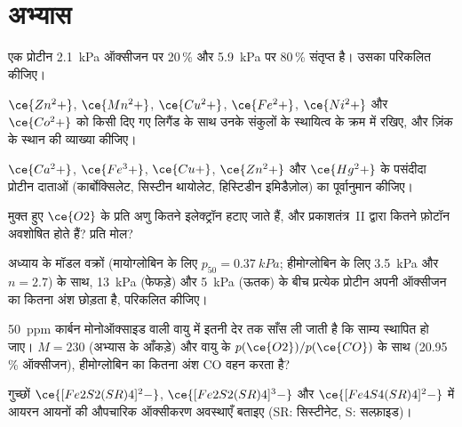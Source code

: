 \section{अभ्यास}

\begin{exercise}[$\star$]\label{exo:b3:bioinorganic:1}
एक प्रोटीन \qty{2.1}{kPa} ऑक्सीजन पर 20\,\% और \qty{5.9}{kPa} पर 80\,\% संतृप्त है। उसका
 परिकलित कीजिए।
\end{exercise}

\begin{exercise}[$\star$]\label{exo:b3:bioinorganic:2}
$\ce{Zn^2+}$, $\ce{Mn^2+}$, $\ce{Cu^2+}$, $\ce{Fe^2+}$, $\ce{Ni^2+}$ और $\ce{Co^2+}$ को किसी दिए गए लिगैंड के साथ उनके संकुलों के स्थायित्व के क्रम में
रखिए, और ज़िंक के स्थान की व्याख्या कीजिए।
\end{exercise}

\begin{exercise}[$\star$]\label{exo:b3:bioinorganic:3}
$\ce{Ca^2+}$, $\ce{Fe^3+}$, $\ce{Cu+}$, $\ce{Zn^2+}$ और $\ce{Hg^2+}$ के पसंदीदा प्रोटीन दाताओं (कार्बोक्सिलेट, सिस्टीन थायोलेट,
हिस्टिडीन इमिडैज़ोल) का पूर्वानुमान कीजिए।
\end{exercise}

\begin{exercise}[$\star$]\label{exo:b3:bioinorganic:4}
मुक्त हुए $\ce{O2}$ के प्रति अणु कितने इलेक्ट्रॉन हटाए जाते हैं, और प्रकाशतंत्र~II द्वारा कितने फ़ोटॉन
अवशोषित होते हैं? प्रति मोल?
\end{exercise}

\begin{exercise}[$\star\star$]\label{exo:b3:bioinorganic:5}
अध्याय के मॉडल वक्रों (मायोग्लोबिन के लिए $p_{50} = \qty{0.37}{kPa}$; हीमोग्लोबिन के लिए \qty{3.5}{kPa} और $n = 2.7$) के साथ,
\qty{13}{kPa} (फेफड़े) और \qty{5}{kPa} (ऊतक) के बीच प्रत्येक प्रोटीन अपनी ऑक्सीजन का कितना अंश छोड़ता है,
परिकलित कीजिए।
\end{exercise}

\begin{exercise}[$\star\star$]\label{exo:b3:bioinorganic:6}
\qty{50}{ppm} कार्बन मोनोऑक्साइड वाली वायु में इतनी देर तक साँस ली जाती है कि
साम्य स्थापित हो जाए। $M = 230$ (अभ्यास के आँकड़े) और वायु के $p(\ce{O2})/p(\ce{CO})$ के साथ
(20.95\,\% ऑक्सीजन), हीमोग्लोबिन का कितना अंश CO वहन करता है?
\end{exercise}

\begin{exercise}[$\star\star$]\label{exo:b3:bioinorganic:7}
गुच्छों $\ce{[Fe2S2(SR)4]^2-}$,
$\ce{[Fe2S2(SR)4]^3-}$ और $\ce{[Fe4S4(SR)4]^2-}$ में आयरन आयनों की औपचारिक ऑक्सीकरण अवस्थाएँ बताइए (SR: सिस्टीनेट, S: सल्फ़ाइड)।
\end{exercise}


